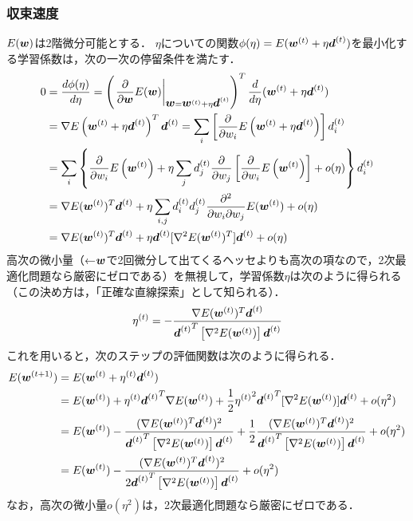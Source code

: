 \subsubsection{収束速度}
$E(\mbox{\boldmath $w$})$は2階微分可能とする．
$\eta$についての関数$\phi(\eta)=E(\mbox{\boldmath $w$}^{(t)}+\eta\mbox{\boldmath $d$}^{(t)})$を最小化する学習係数は，次の一次の停留条件を満たす．
\begin{align*}
 0
 &= \frac{d\phi(\eta)}{d\eta}
 = \left(\left.\frac{\partial}{\partial \mbox{\boldmath $w$}}E(\mbox{\boldmath $w$})\right|_{\mbox{\boldmath $w$}=\mbox{\boldmath $w$}^{(t)}+\eta\mbox{\boldmath $d$}^{(t)}}\right)^T \frac{d}{d\eta}(\mbox{\boldmath $w$}^{(t)}+\eta\mbox{\boldmath $d$}^{(t)})
 \\
 &= \nabla E\left(\mbox{\boldmath $w$}^{(t)}+\eta\mbox{\boldmath $d$}^{(t)}\right)^T\mbox{\boldmath $d$}^{(t)} = \sum_i\left[\frac{\partial}{\partial w_i} E\left(\mbox{\boldmath $w$}^{(t)}+\eta\mbox{\boldmath $d$}^{(t)}\right)\right]d_i^{(t)}
 \\
 &= \sum_i\left\{
 \frac{\partial}{\partial w_i} E\left(\mbox{\boldmath $w$}^{(t)}\right)
 + \eta \sum_jd_j^{(t)}\frac{\partial}{\partial w_j}\left[ \frac{\partial}{\partial w_i} E\left(\mbox{\boldmath $w$}^{(t)}\right) \right] + o(\eta)
 \right\} d_i^{(t)}
 \\
 &=
 \nabla E(\mbox{\boldmath $w$}^{(t)})^T\mbox{\boldmath $d$}^{(t)}
 + \eta \sum_{i,j} d_i^{(t)} d_j^{(t)} \frac{\partial^2}{\partial w_i\partial w_j}E(\mbox{\boldmath $w$}^{(t)})
 + o(\eta)
 \\
 &=
 \nabla E(\mbox{\boldmath $w$}^{(t)})^T\mbox{\boldmath $d$}^{(t)}
 + \eta \mbox{\boldmath $d$}^{(t)} [\nabla^2 E(\mbox{\boldmath $w$}^{(t)})^T] \mbox{\boldmath $d$}^{(t)}
 + o(\eta)
\end{align*}
高次の微小量（←$\mbox{\boldmath $w$}$で2回微分して出てくるヘッセよりも高次の項なので，2次最適化問題なら厳密にゼロである）を無視して，学習係数$\eta$は次のように得られる（この決め方は，「正確な直線探索」として知られる）．
\begin{align*}
 \eta^{(t)} = -\frac{\nabla E(\mbox{\boldmath $w$}^{(t)})^T\mbox{\boldmath $d$}^{(t)}}
 {{\mbox{\boldmath $d$}^{(t)}}^T\left[
    \nabla^2E(\mbox{\boldmath $w$}^{(t)})
  \right]\mbox{\boldmath $d$}^{(t)}}
\end{align*}
これを用いると，次のステップの評価関数は次のように得られる．
\begin{align*}
 E(\mbox{\boldmath $w$}^{(t+1)})
 &=
 E(\mbox{\boldmath $w$}^{(t)}+\eta^{(t)}\mbox{\boldmath $d$}^{(t)})
 \\
 &= E(\mbox{\boldmath $w$}^{(t)})
 + \eta^{(t)}{\mbox{\boldmath $d$}^{(t)}}^T\nabla E(\mbox{\boldmath $w$}^{(t)})
 + \frac{1}{2}{\eta^{(t)}}^2{\mbox{\boldmath $d$}^{(t)}}^T[\nabla^2 E(\mbox{\boldmath $w$}^{(t)})]\mbox{\boldmath $d$}^{(t)}
 + o(\eta^2)
 \\
 &= E(\mbox{\boldmath $w$}^{(t)})
 -\frac{(\nabla E(\mbox{\boldmath $w$}^{(t)})^T\mbox{\boldmath $d$}^{(t)})^2}
 {{\mbox{\boldmath $d$}^{(t)}}^T\left[
    \nabla^2E(\mbox{\boldmath $w$}^{(t)})
  \right]\mbox{\boldmath $d$}^{(t)}}
  +\frac{1}{2}\frac{(\nabla E(\mbox{\boldmath $w$}^{(t)})^T\mbox{\boldmath $d$}^{(t)})^2}
  {{\mbox{\boldmath $d$}^{(t)}}^T\left[
     \nabla^2E(\mbox{\boldmath $w$}^{(t)})
   \right]\mbox{\boldmath $d$}^{(t)}}
   + o(\eta^2)
   \\
   &= E(\mbox{\boldmath $w$}^{(t)})
   -\frac{(\nabla E(\mbox{\boldmath $w$}^{(t)})^T\mbox{\boldmath $d$}^{(t)})^2}
   {2{\mbox{\boldmath $d$}^{(t)}}^T\left[
      \nabla^2E(\mbox{\boldmath $w$}^{(t)})
    \right]\mbox{\boldmath $d$}^{(t)}}
     + o(\eta^2)
\end{align*}
なお，高次の微小量$o(\eta^2)$は，2次最適化問題なら厳密にゼロである．

